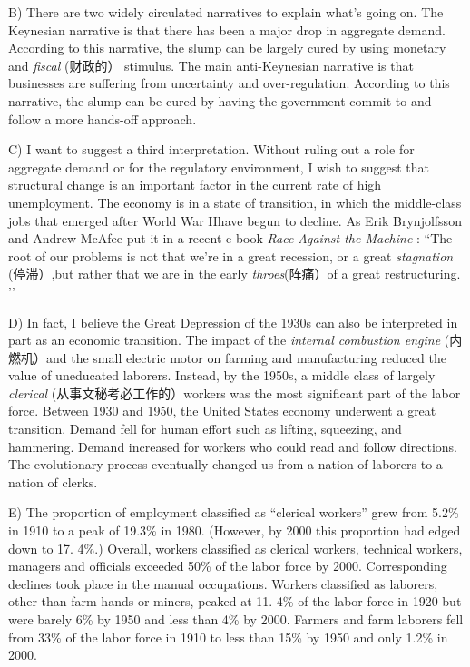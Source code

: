 \documentclass[UTF8,11pt]{ctexart}
\begin{document}
B) There are two widely circulated narratives to explain what’s going on. The Keynesian narrative is that there has been a major drop in aggregate demand. According to this narrative, the slump can be largely cured by using monetary and\textit{ fiscal} (财政的） stimulus. The main anti-Keynesian narrative is that businesses are suffering from uncertainty and over-regulation. According to this narrative, the slump can be cured by having the government commit to and follow a more hands-off approach.


C) I want to suggest a third interpretation. Without ruling out a role for aggregate demand or for the regulatory environment, I wish to suggest that structural change is an important factor in the current rate of high unemployment. The economy is in a state of transition, in which the middle-class jobs that emerged after World War IIhave begun to decline. As Erik Brynjolfsson and Andrew McAfee put it in a recent e-book\textit{ Race Against the Machine} : “The root of our problems is not that we’re in a great recession, or a great\textit{ stagnation} (停滞）,but rather that we are in the early\textit{ throes}(阵痛）of a great restructuring. ’’


D) In fact, I believe the Great Depression of the 1930s can also be interpreted in part as an economic transition. The impact of the\textit{ internal combustion engine} (内燃机）and the small electric motor on farming and manufacturing reduced the value of uneducated laborers. Instead, by the 1950s, a middle class of largely\textit{ clerical} (从事文秘考必工作的）workers was the most significant part of the labor force. Between 1930 and 1950, the United States economy underwent a great transition. Demand fell for human effort such as lifting, squeezing, and hammering. Demand increased for workers who could read and follow directions. The evolutionary process eventually changed us from a nation of laborers to a nation of clerks.


E) The proportion of employment classified as “clerical workers” grew from 5.2\% in 1910 to a peak of 19.3\% in 1980. (However, by 2000 this proportion had edged down to 17. 4\%.) Overall, workers classified as clerical workers, technical workers, managers and officials exceeded 50\% of the labor force by 2000. Corresponding declines took place in the manual occupations. Workers classified as laborers, other than farm hands or miners, peaked at 11. 4\% of the labor force in 1920 but were barely 6\% by 1950 and less than 4\% by 2000. Farmers and farm laborers fell from 33\% of the labor force in 1910 to less than 15\% by 1950 and only 1.2\% in 2000.
\end{document}
